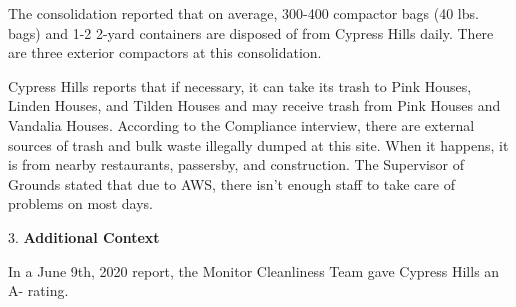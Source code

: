 The consolidation reported that on average, 300-400 compactor bags (40 lbs. bags) and 1-2 2-yard containers are disposed of from Cypress Hills daily. There are three exterior compactors at this consolidation.

Cypress Hills reports that if necessary, it can take its trash to Pink Houses, Linden Houses, and Tilden Houses and may receive trash from Pink Houses and Vandalia Houses. According to the Compliance interview, there are external sources of trash and bulk waste illegally dumped at this site. When it happens, it is from nearby restaurants, passersby, and construction. The Supervisor of Grounds stated that due to AWS, there isn't enough staff to take care of problems on most days. 

3. \textbf{Additional Context} 

In a June 9th, 2020 report, the Monitor Cleanliness Team gave Cypress Hills an A- rating. 